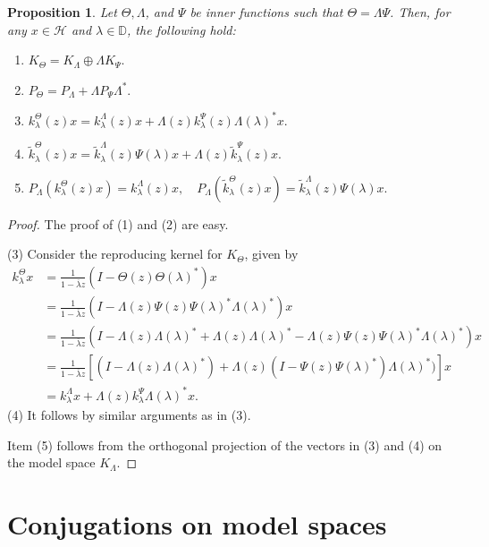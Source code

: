 \documentclass[12pt]{amsart}
\numberwithin{equation}{section}
\newcommand{\hsp}{\mathcal{H}}
\newtheorem{proposition}[theorem]{Proposition}
\theoremstyle{definition}
\numberwithin{equation}{section}
\begin{document}
 \begin{proposition}
Let $\Theta, \Lambda$, and $\Psi$ be inner functions  such that $\Theta=\Lambda\Psi$. Then, for any $x\in \hsp$ and $\lambda\in \mathbb{D}$, the following hold:
\begin{enumerate}[(1)]
    \item $K_{\Theta}=K_{\Lambda}\oplus \Lambda K_{\Psi}.$\label{decom}
    \item $P_{\Theta}=P_{\Lambda}+\Lambda P_{\Psi}\Lambda^{*}.$
\item $k_{\lambda}^{\Theta}(z)x=k_{\lambda}^{\Lambda}(z)x+\Lambda(z)k_{\lambda}^{\Psi}(z)\Lambda(\lambda)^{*}x.$
    \item $\widetilde{k}_{\lambda}^{\Theta}(z)x=\widetilde{k}_{\lambda}^{\Lambda}(z)\Psi(\lambda)x+\Lambda(z)\widetilde{k}_{\lambda}^{\Psi}(z)x.$
\item $P_{\Lambda}(k_{\lambda}^{\Theta}(z)x)=k_{\lambda}^{\Lambda}(z)x, \quad P_{\Lambda}(\widetilde{k}_{\lambda}^{\Theta}(z)x)=\widetilde{k}_{\lambda}^{\Lambda}(z)\Psi(\lambda)x.$
\end{enumerate}
 \end{proposition}
\begin{proof}
The proof of (1) and (2) are easy.

\noindent (3) Consider the reproducing kernel for $K_\Theta$, given by
\begin{align*}
k_{\lambda}^{\Theta}x
&=\frac{1}{1-\overline{\lambda}z}(I-\Theta(z)\Theta(\lambda)^{*})x\\
&=\frac{1}{1-\overline{\lambda}z}(I-\Lambda(z)\Psi(z)\Psi(\lambda)^{*}\Lambda(\lambda)^{*})x\\
&=\frac{1}{1-\overline{\lambda}z}(I-\Lambda(z)\Lambda(\lambda)^{*}+\Lambda(z)\Lambda(\lambda)^{*}
-\Lambda(z)\Psi(z)\Psi(\lambda)^{*}\Lambda(\lambda)^{*})x\\
&=\frac{1}{1-\overline{\lambda}z}[(I-\Lambda(z)\Lambda(\lambda)^{*})+\Lambda(z)(I
-\Psi(z)\Psi(\lambda)^{*})\Lambda(\lambda)^{*})]x\\
&=k_{\lambda}^{\Lambda}x+\Lambda(z)k_{\lambda}^{\Psi}\Lambda(\lambda)^{*}x.
\end{align*}
(4) It follows by similar arguments as in (3).

\noindent Item (5) follows from the orthogonal projection of the vectors in (3) and (4) on the model space $K_{\Lambda}$.
\end{proof}






\section{\bf{Conjugations on model spaces}}
\end{document}

